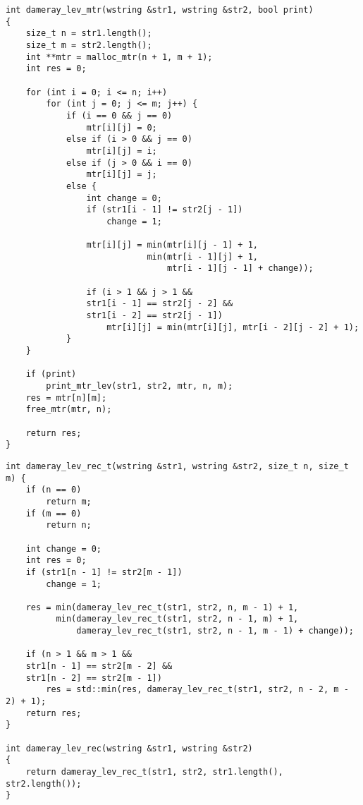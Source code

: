 \clearpage

\begin{lstlisting}[label=lst:dameray_lev_rec,caption=Функция нахождения расстояния Дамерау-Левенштейна с использованием матрицы]
int dameray_lev_mtr(wstring &str1, wstring &str2, bool print)
{
	size_t n = str1.length();
	size_t m = str2.length();
	int **mtr = malloc_mtr(n + 1, m + 1);
	int res = 0;
	
	for (int i = 0; i <= n; i++)
		for (int j = 0; j <= m; j++) {
			if (i == 0 && j == 0)
				mtr[i][j] = 0;
			else if (i > 0 && j == 0)
				mtr[i][j] = i;
			else if (j > 0 && i == 0)
				mtr[i][j] = j;
			else {
				int change = 0;
				if (str1[i - 1] != str2[j - 1])
					change = 1;
				
				mtr[i][j] = min(mtr[i][j - 1] + 1,
							min(mtr[i - 1][j] + 1,
								mtr[i - 1][j - 1] + change));
				
				if (i > 1 && j > 1 &&
				str1[i - 1] == str2[j - 2] &&
				str1[i - 2] == str2[j - 1])
					mtr[i][j] = min(mtr[i][j], mtr[i - 2][j - 2] + 1);
			}
	}
	
	if (print)
		print_mtr_lev(str1, str2, mtr, n, m);
	res = mtr[n][m];
	free_mtr(mtr, n);
	
	return res;
}
\end{lstlisting}

\clearpage

\begin{lstlisting}[label=lst:dameray_lev_mtr,caption=Функция нахождения расстояния Дамерау-Левенштейна рекурсивно]
int dameray_lev_rec_t(wstring &str1, wstring &str2, size_t n, size_t m) {
	if (n == 0)
		return m;
	if (m == 0)
		return n;
	
	int change = 0;
	int res = 0;
	if (str1[n - 1] != str2[m - 1])
		change = 1;
	
	res = min(dameray_lev_rec_t(str1, str2, n, m - 1) + 1,
		  min(dameray_lev_rec_t(str1, str2, n - 1, m) + 1,
		      dameray_lev_rec_t(str1, str2, n - 1, m - 1) + change));
	
	if (n > 1 && m > 1 &&
	str1[n - 1] == str2[m - 2] &&
	str1[n - 2] == str2[m - 1])
		res = std::min(res, dameray_lev_rec_t(str1, str2, n - 2, m - 2) + 1);
	return res;
}

int dameray_lev_rec(wstring &str1, wstring &str2)
{
	return dameray_lev_rec_t(str1, str2, str1.length(), str2.length());
}
\end{lstlisting}

\clearpage

